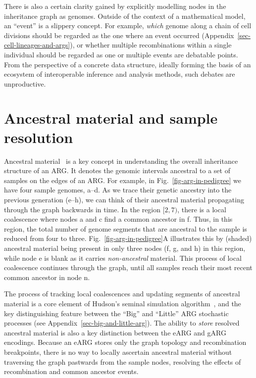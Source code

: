 \documentclass{article}
\newcommand{\noderef}[1]{\textsf{#1}}
\begin{document}
There is also a certain clarity gained by explicitly modelling nodes
in the inheritance graph as genomes.
Outside of the context of a
mathematical model, an ``event'' is a slippery concept.
For example, \emph{which} genome along a chain of cell divisions should be
regarded as the one where an event occurred
(Appendix~\ref{sec-cell-lineages-and-args}),
or whether multiple recombinations
within a single individual should be regarded as one or multiple events are
debatable points.
From the perspective of a concrete data structure,
ideally forming the basis of an ecosystem of interoperable
inference and analysis methods, such debates
are unproductive.

\section{Ancestral material and sample resolution}
\label{sec-ancestral-material}
Ancestral material~\citep{wiuf1999ancestry,wiuf1999recombination}
is a key concept in understanding the overall inheritance structure
of an ARG. It denotes the genomic intervals ancestral to a set of samples
on the edges of an ARG.
For example, in Fig.~\ref{fig-arg-in-pedigree} we have
four sample genomes, \noderef{a}--\noderef{d}. As we
trace their genetic ancestry into the previous generation
(\noderef{e}--\noderef{h}), we can think of their ancestral
material propagating through the graph
backwards in time. In the region $[2, 7)$, there is a
local coalescence where nodes \noderef{a} and \noderef{c}
find a common ancestor in \noderef{f}. Thus, in this region,
the total number of genome segments that are ancestral to the
sample is reduced from four to three. Fig.~\ref{fig-arg-in-pedigree}A
illustrates this by (shaded) ancestral material being present
in only three nodes (\noderef{f}, \noderef{g}, and \noderef{h}) in this region,
while node \noderef{e} is blank
as it carries \emph{non-ancestral} material.
This process of local coalescence continues through the
graph, until all samples reach their most recent common
ancestor in node \noderef{n}.

The process of tracking local coalescences and updating
segments of ancestral material is a core element of
Hudson's seminal simulation
algorithm~\citep{hudson1983testing,kelleher2016efficient},
and the key distinguishing feature between the
``Big'' and ``Little'' ARG stochastic processes
(see Appendix~\ref{sec-big-and-little-arg}).
The ability to \emph{store} resolved ancestral material
is also a key distinction between the eARG and gARG
encodings. Because an eARG stores only the graph topology and
recombination breakpoints, there is no way to locally
ascertain ancestral material without traversing the graph
pastwards from the sample nodes,
resolving the effects of recombination and common ancestor events.
\end{document}
